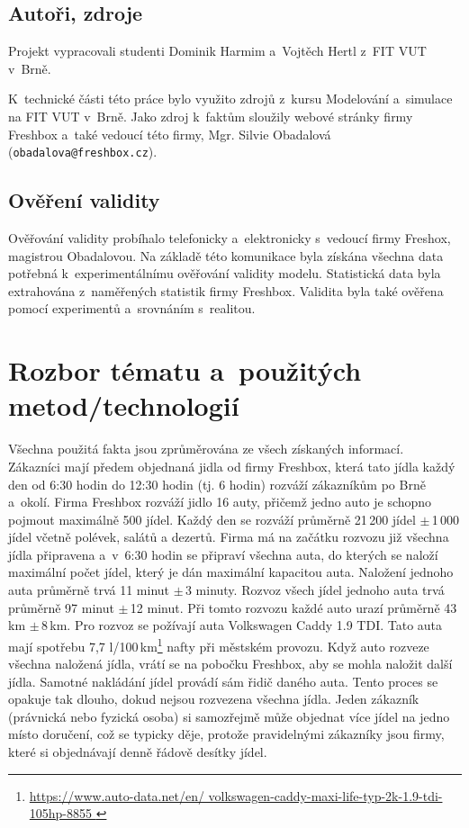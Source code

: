\documentclass[a4paper, 11pt]{article}
\begin{document}
	\subsection{Autoři, zdroje}

	Projekt vypracovali studenti Dominik Harmim a~Vojtěch Hertl z~FIT VUT
	v~Brně.

	K~technické části této práce bylo využito zdrojů z~kursu Modelování
	a~simulace na FIT VUT v~Brně. Jako zdroj k~faktům sloužily webové stránky
	firmy Freshbox a~také vedoucí této firmy, Mgr. Silvie Obadalová \\
	(\texttt{obadalova@freshbox.cz}).


	\subsection{Ověření validity}

	Ověřování validity \cite[snímek 37]{Freshbox} probíhalo telefonicky
	a~elektronicky s~vedoucí firmy Freshox, magistrou Obadalovou. Na základě
	této komunikace byla získána všechna data potřebná k~experimentálnímu
	ověřování validity modelu. Statistická data byla extrahována z~naměřených
	statistik firmy Freshbox. Validita byla také ověřena pomocí experimentů
	a~srovnáním s~realitou.



	\section{Rozbor tématu a~použitých metod/technologií}

	Všechna použitá fakta jsou zprůměrována ze všech získaných informací. \\

	Zákazníci mají předem objednaná jidla od firmy Freshbox, která tato jídla
	každý den od 6:30 hodin do 12:30 hodin (tj. 6 hodin) rozváží zákazníkům po
	Brně a~okolí. Firma Freshbox rozváží jidlo 16 auty, přičemž jedno auto
	je schopno pojmout maximálně 500 jídel. Každý den se rozváží
	průměrně 21\,200 jídel $\pm$\,1\,000 jídel včetně polévek, salátů a dezertů. Firma má na začátku rozvozu
	již všechna jídla připravena a~v~6:30 hodin se připraví všechna auta,
	do kterých se naloží maximální počet jídel, který je dán maximální
	kapacitou auta. Naložení jednoho auta průměrně trvá 11 minut
	$\pm$\,3 minuty. Rozvoz všech jídel jednoho auta trvá průměrně 97 minut
	$\pm$\,12 minut. Při tomto rozvozu každé auto urazí průměrně 43 km
	$\pm$\,8\,km. Pro rozvoz se požívají auta Volkswagen Caddy 1.9 TDI.
	Tato auta mají spotřebu 7,7 l/100\,km\footnote{
		\url{https://www.auto-data.net/en/
			volkswagen-caddy-maxi-life-typ-2k-1.9-tdi-105hp-8855
		}
	} nafty při městském provozu. Když auto rozveze všechna naložená jídla,
	vrátí se na pobočku Freshbox, aby se mohla naložit další jídla. Samotné
	nakládání jídel provádí sám řidič daného auta. Tento proces se opakuje
	tak dlouho, dokud nejsou rozvezena všechna jídla. Jeden zákazník
	(právnická nebo fyzická osoba) si samozřejmě může objednat více jídel na
	jedno místo doručení, což se typicky děje, protože pravidelnými zákazníky
	jsou firmy, které si objednávají denně řádově desítky jídel.
\end{document}
